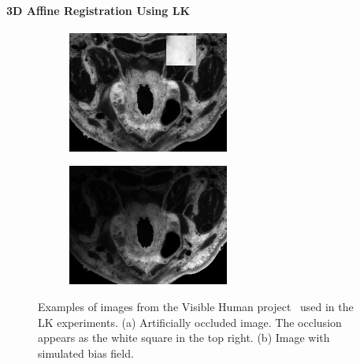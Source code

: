 \paragraph{3D Affine Registration Using LK}\label{subsubsec:lk_results}
\begin{figure}[t]
    \centering
    \begin{subfigure}{0.47\columnwidth}
        \includegraphics[width=\textwidth]{statistical_normals/lk/3d/images/occluded-example}
        \caption{}\label{fig:lk_occluded_example}
    \end{subfigure}
    \begin{subfigure}{0.47\columnwidth}
        \includegraphics[width=\textwidth]{statistical_normals/lk/3d/images/biasfield-example}
        \caption{}\label{fig:lk_biasfield_example}
    \end{subfigure}
    \caption{Examples of images from the Visible Human 
             project~\cite{spitzer1996visiblehuman} 
             used in the LK experiments. (a) Artificially occluded image. The
             occlusion appears as the white square in the top right. (b) Image
             with simulated bias field.}
\label{fig:lk_affine_examples}
\end{figure}
